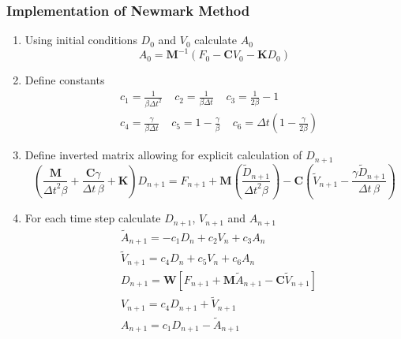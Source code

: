 \documentclass[xcolor=svgnames,9pt]{beamer}
\theoremstyle{remark}
\begin{document}
		\begin{frame}
  			\frametitle{Implementation of Newmark Method}
			\begin{enumerate}
				\item Using initial conditions $D_0$ and $V_0$ calculate $A_0$
					\begin{equation*}
						A_{{0}}= \textbf{M}^{-1} (F_{{0}} -\textbf{C}V_{{0}}-\textbf{K}D_{{0}})
					\end{equation*}
				\item Define constants
					\begin{align*}
						&c_1 = {\frac {1}{{\beta \Delta t}^{2}}}\ \ \ \ \ c_2 =\frac{1}{\beta \Delta t }\ \ \ \ \ c_3 = \frac{1}{2\beta}-1\\
						&c_4 = \frac {\gamma}{\beta \Delta t}\ \ \ \ \ c_5 = 1-{\frac {\gamma}{\beta}}\ \ \ \ \ c_6 = \Delta t \left( 1-{\frac {\gamma}{2\beta}} \right)
					\end{align*}
				\item Define inverted matrix allowing for explicit calculation of $D_{n+1}$
					\begin{equation*}
						\left( {\frac {\textbf{M}}{{\Delta t}^{2}\beta}}+{\frac {\textbf{C}\gamma}{\Delta t\,\beta}}+\textbf{K} \right) D_{{n+1}}=F_{{n+1}}+\textbf{M} \left( {\frac {\widetilde{D}_{{n+1}}}{{\Delta t}^{2}\beta}} \right) -\textbf{C}\left({{\widetilde{V}_{{n+1}}-{\frac {\gamma \widetilde{D}_{{n+1}}}{\Delta t\,\beta}}}}\right)
					\end{equation*}
				\item For each time step calculate $D_{n+1}$, $V_{n+1}$ and $A_{n+1}$
					\begin{align*}
						&\widetilde{A}_{{n+1}}=-c_1D_n+c_2V_n+c_3A_n\\
						&\widetilde{V}_{{n+1}}=c_4D_n+c_5V_n+c_6A_n\\
						&D_{{n+1}}=\textbf{W}[F_{{n+1}}+\textbf{M}\widetilde{A}_{{n+1}}-\textbf{C}\widetilde{V}_{{n+1}}]\\
						&V_{n+1} = c_4D_{n+1}+\widetilde{V}_{{n+1}}\\
						&A_{n+1}= c_1D_{n+1}-\widetilde{A}_{{n+1}}
					\end{align*}
			\end{enumerate}
		\end{frame}
\end{document}
